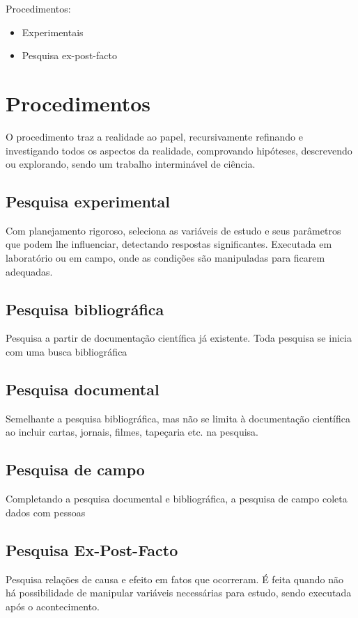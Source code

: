Procedimentos:
\begin{itemize}
    \item Experimentais
    \item Pesquisa ex-post-facto
\end{itemize}


\section{Procedimentos}
O procedimento traz a realidade ao papel, recursivamente refinando e investigando todos os aspectos da realidade, comprovando hipóteses, descrevendo ou explorando, sendo um trabalho interminável de ciência.

\subsection{Pesquisa experimental\label{experimental}}
Com planejamento rigoroso, seleciona as variáveis de estudo e seus parâmetros que podem lhe influenciar, detectando respostas significantes. Executada em laboratório ou em campo, onde as condições são manipuladas para ficarem adequadas.

\subsection{Pesquisa bibliográfica\label{bibliografica}}
Pesquisa a partir de documentação científica já existente. Toda pesquisa se inicia com uma busca bibliográfica

\subsection{Pesquisa documental}
Semelhante a pesquisa bibliográfica, mas não se limita à documentação científica ao incluir cartas, jornais, filmes, tapeçaria etc. na pesquisa.

\subsection{Pesquisa de campo}
Completando a pesquisa documental e bibliográfica, a pesquisa de campo coleta dados com pessoas

\subsection{Pesquisa Ex-Post-Facto}
Pesquisa relações de causa e efeito em fatos que ocorreram. É feita quando não há possibilidade de manipular variáveis necessárias para estudo, sendo executada após o acontecimento.

